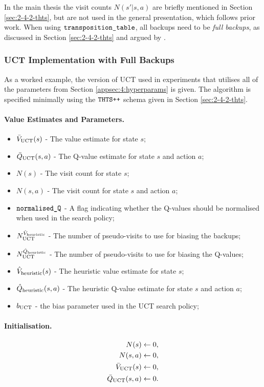     In the main thesis the visit counts $N(s'|s,a)$ are briefly mentioned in Section \ref{sec:2-4-2-thts}, but are not used in the general presentation, which follows prior work. When using ${\textnormal{\texttt{transposition\_table}}}$, all backups need to be \textit{full backups}, as discussed in Section \ref{sec:2-4-2-thts} and argued by \citet{katago}.


\subsubsection{UCT Implementation with Full Backups}
\label{appsec:4:uct_full_backups}
    As a worked example, the version of UCT used in experiments that utilises all of the parameters from Section \ref{appsec:4:hyperparams} is given. The algorithm is specified minimally using the ${\textnormal{\texttt{THTS++}}}$ schema given in Section \ref{sec:2-4-2-thts}.

    \paragraph{Value Estimates and Parameters.}
    
        \begin{itemize}
            \item ${\bar{V}_{{\textnormal{UCT}}}}(s)$ - The value estimate for state $s$;
            \item ${\bar{Q}_{{\textnormal{UCT}}}}(s,a)$ - The Q-value estimate for state $s$ and action $a$;
            \item $N(s)$ - The visit count for state $s$;
            \item $N(s,a)$ - The visit count for state $s$ and action $a$;
            \item ${\textnormal{\texttt{normalised\_Q}}}$ - A flag indicating whether the Q-values should be normalised when used in the search policy;
            \item $N^{{\hat{V}_{\textnormal{heuristic}}}}_{{\textnormal{UCT}}}$ - The number of pseudo-visits to use for biasing the backups;
            \item $N^{{\hat{Q}_{\textnormal{heuristic}}}}_{{\textnormal{UCT}}}$ - The number of pseudo-visits to use for biasing the Q-values;
            \item ${\hat{V}_{\textnormal{heuristic}}}(s)$ - The heuristic value estimate for state $s$;
            \item ${\hat{Q}_{\textnormal{heuristic}}}(s,a)$ - The heuristic Q-value estimate for state $s$ and action $a$;
            \item ${b_{{\textnormal{UCT}}}}$ - the bias parameter used in the UCT search policy;
        \end{itemize}

    \paragraph{Initialisation.}
        \begin{align}
            N(s) \leftarrow 0, \\
            N(s,a) \leftarrow 0, \\
            {\bar{V}_{{\textnormal{UCT}}}}(s) \leftarrow 0, \\
            {\bar{Q}_{{\textnormal{UCT}}}}(s,a) \leftarrow 0.
        \end{align}

